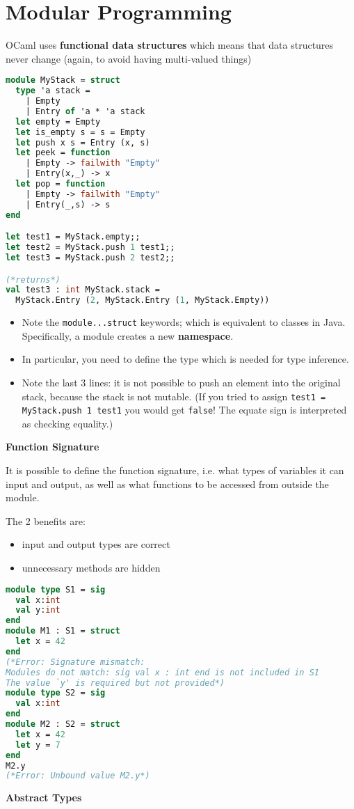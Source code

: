 \documentclass[12pt,a4paper]{article} %
\begin{document}
\section{Modular Programming}
OCaml uses \textbf{functional data structures} which means that data structures never change (again, to avoid having multi-valued things)
\begin{lstlisting}[language=Caml]
module MyStack = struct
  type 'a stack =
    | Empty
    | Entry of 'a * 'a stack
  let empty = Empty
  let is_empty s = s = Empty
  let push x s = Entry (x, s)
  let peek = function
    | Empty -> failwith "Empty"
    | Entry(x,_) -> x
  let pop = function
    | Empty -> failwith "Empty"
    | Entry(_,s) -> s
end

let test1 = MyStack.empty;;
let test2 = MyStack.push 1 test1;;
let test3 = MyStack.push 2 test2;;

(*returns*)
val test3 : int MyStack.stack =
  MyStack.Entry (2, MyStack.Entry (1, MyStack.Empty))
\end{lstlisting}
\begin{itemize}
	\item Note the \verb|module...struct| keywords; which is equivalent to classes in Java. Specifically, a module creates a new \textbf{namespace}.
	\item In particular, you need to define the type which is needed for type inference.
	\item Note the last 3 lines: it is not possible to push an element into the original stack, because the stack is not mutable. (If you tried to assign \verb|test1 = MyStack.push 1 test1| you would get \verb|false|! The equate sign is interpreted as checking equality.)
\end{itemize}
\textbf{Function Signature}

It is possible to define the function signature, i.e. what types of variables it can input and output, as well as what functions to be accessed from outside the module.

The 2 benefits are:
\begin{itemize}
	\item input and output types are correct
	\item unnecessary methods are hidden
\end{itemize}
\begin{lstlisting}[language=Caml]
module type S1 = sig
  val x:int
  val y:int
end
module M1 : S1 = struct
  let x = 42
end
(*Error: Signature mismatch:
Modules do not match: sig val x : int end is not included in S1
The value `y' is required but not provided*)
module type S2 = sig
  val x:int
end
module M2 : S2 = struct
  let x = 42
  let y = 7
end
M2.y
(*Error: Unbound value M2.y*)
\end{lstlisting}
\textbf{Abstract Types}
\end{document}
